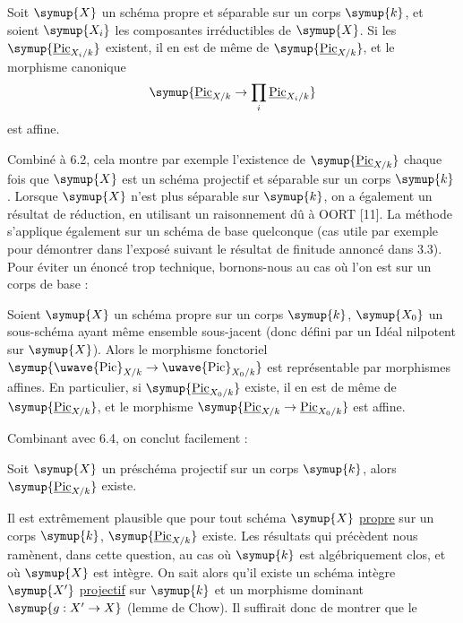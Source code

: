  Soit $\symup{X}$ un schéma propre et séparable sur un corps
$\symup{k}$, et soient $\symup{X_i}$ les composantes irréductibles de $\symup{X}$. Si les
$\symup{\underline{\operatorname{Pic}}_{X_i/k}}$ existent, il en est de même de
$\symup{\underline{\operatorname{Pic}}_{X/k}}$, et le morphisme canonique
\[
\symup{\underline{\operatorname{Pic}}_{X/k}\to\prod\limits_i\underline{\operatorname{Pic}}_{X_i/k}}
\]
est affine.

Combiné à 6.2, cela montre par exemple l'existence de
$\symup{\underline{\operatorname{Pic}}_{X/k}}$ chaque fois que $\symup{X}$ est un schéma projectif et
séparable sur un corps $\symup{k}$. Lorsque $\symup{X}$ n'est plus séparable sur $\symup{k}$, on a
également un résultat de réduction, en utilisant un raisonnement dû à OORT
[11]. La méthode s'applique également sur un schéma de base quelconque (cas
utile par exemple pour démontrer dans l'exposé suivant le résultat de finitude
annoncé dans 3.3). Pour éviter un énoncé trop technique, bornons-nous au cas où
l'on est sur un corps de base :

 Soient $\symup{X}$ un schéma propre sur un corps $\symup{k}$, $\symup{X_0}$
un sous-schéma ayant même ensemble sous-jacent (donc défini par un Idéal
nilpotent sur $\symup{X}$). Alors le morphisme fonctoriel
$\symup{\text{\uwave{Pic}}_{X/k}\to\text{\uwave{Pic}}_{X_0/k}}$ est représentable par morphismes affines. En particulier, si
$\symup{\underline{\operatorname{Pic}}_{X_0/k}}$ existe, il en est de même de
$\symup{\underline{\operatorname{Pic}}_{X/k}}$, et le morphisme
$\symup{\underline{\operatorname{Pic}}_{X/k}\to\underline{\operatorname{Pic}}_{X_0/k}}$ est
affine.

Combinant avec 6.4, on conclut facilement :

 Soit $\symup{X}$ un préschéma projectif sur un corps $\symup{k}$,
alors $\symup{\underline{\operatorname{Pic}}_{X/k}}$ existe.

 Il est extrêmement plausible que pour tout schéma $\symup{X}$
\uline{propre} sur un corps $\symup{k}$, $\symup{\underline{\operatorname{Pic}}_{X/k}}$ existe.
Les résultats qui précèdent nous ramènent, dans cette question, au cas où $\symup{k}$
est algébriquement clos, et où $\symup{X}$ est intègre. On sait alors qu'il existe un
schéma intègre $\symup{X'}$ \uline{projectif} sur $\symup{k}$ et un morphisme dominant
$\symup{g:X'\to X}$ (lemme de Chow). Il suffirait donc de montrer que le


